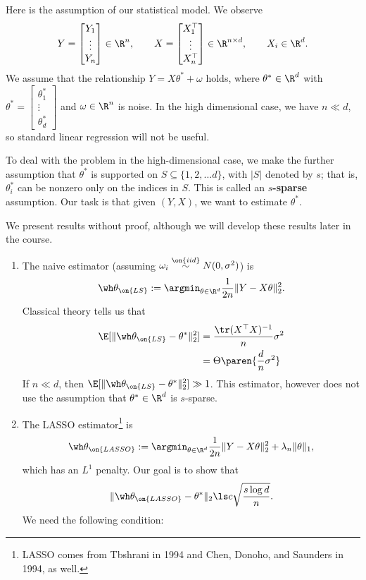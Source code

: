 \begin{ex}
Here is the assumption of our statistical model. We observe
$$Y = \begin{bmatrix} Y_1 \\ \vdots \\ Y_n \end{bmatrix} \in \R^n, \qquad X = \begin{bmatrix} X_1^\top \\ \vdots \\ X_n^\top \end{bmatrix} \in \R^{n \times d}, \qquad X_i \in \R^d.$$
We assume that the relationship $Y = X \theta^* + \omega$ holds, where $\theta^* \in \R^d$ with $\theta^* = \begin{bmatrix} \theta_1^* \\ \vdots \\ \theta_d^* \end{bmatrix}$ and $\omega \in \R^n$ is noise. In the high dimensional case, we have $n \ll d$, so standard linear regression will not be useful. 

To deal with the problem in the high-dimensional case, we make the further assumption that $\theta^*$ is supported on $S \subseteq \{1,2,\dots d\}$, with $|S|$ denoted by $s$; that is, $\theta_i^*$ can be nonzero only on the indices in $S$. This is called an \textbf{$s$-sparse} assumption. Our task is that given $(Y,X)$, we want to estimate $\theta^*$.

We present results without proof, although we will develop these results later in the course.

\begin{enumerate}[label = (\alph*)]

\item The naive estimator (assuming $\omega_i \overset{\on{iid}}{\sim} N(0,\sigma^2)$) is
$$\wh \theta_{\on{LS}} := \argmin_{\theta \in \R^d} \frac{1}{2n} \| Y - X \theta \|_2^2.$$
Classical theory tells us that
\begin{align*}
\E[\| \wh \theta_{\on{LS}} - \theta^*\|_2^2] &= \frac{\tr (X^\top X)^{-1}}{n} \sigma^2 \\
&= \Theta \paren{\frac{d}{n} \sigma^2}
\end{align*}
If $n \ll d$, then $\E[\| \wh \theta_{\on{LS}} - \theta^* \|_2^2]  \gg 1$. This estimator, however does not use the assumption that $\theta^* \in \R^d$ is $s$-sparse.

\item The LASSO estimator\footnote{LASSO comes from Tbshrani in 1994 and Chen, Donoho, and Saunders in 1994, as well.} is
$$\wh \theta_{\on{LASSO}} := \argmin_{\theta \in \R^d} \frac{1}{2n} \| Y -X \theta \|_2^2 + \lambda_n \| \theta \|_1,$$
which has an $L^1$ penalty. Our goal is to show that
$$\| \wh \theta_{\on{LASSO}} - \theta^* \|_2 \ls c \sqrt{\frac{s \log d}{n}}.$$
We need the following condition:


\end{enumerate}
\end{ex}
